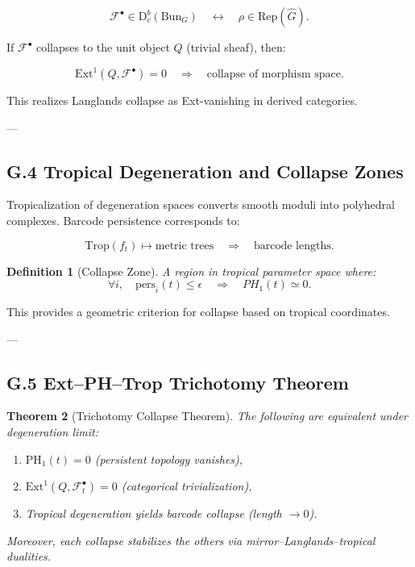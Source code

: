 \documentclass[11pt]{article}
\newtheorem{theorem}{Theorem}[section]
\newtheorem{definition}[theorem]{Definition}
\begin{document}
\[
\mathcal{F}^\bullet \in \mathrm{D}^b_c(\mathrm{Bun}_G) 
\quad \leftrightarrow \quad 
\rho \in \mathrm{Rep}(\widehat{G}).
\]

If $\mathcal{F}^\bullet$ collapses to the unit object $Q$ (trivial sheaf), then:

\[
\mathrm{Ext}^1(Q, \mathcal{F}^\bullet) = 0 
\quad \Rightarrow \quad 
\text{collapse of morphism space}.
\]

This realizes Langlands collapse as Ext-vanishing in derived categories.

---

\subsection*{G.4 Tropical Degeneration and Collapse Zones}

Tropicalization of degeneration spaces converts smooth moduli into polyhedral complexes.  
Barcode persistence corresponds to:

\[
\text{Trop}(f_t) \longmapsto \text{metric trees}
\quad \Rightarrow \quad 
\text{barcode lengths}.
\]

\begin{definition}[Collapse Zone]
A region in tropical parameter space where:
\[
\forall i, \quad \text{pers}_i(t) \leq \epsilon 
\quad \Rightarrow \quad 
PH_1(t) \simeq 0.
\]
\end{definition}

This provides a geometric criterion for collapse based on tropical coordinates.

---

\subsection*{G.5 Ext–PH–Trop Trichotomy Theorem}

\begin{theorem}[Trichotomy Collapse Theorem]
The following are equivalent under degeneration limit:
\begin{enumerate}
  \item $\mathrm{PH}_1(t) = 0$ (persistent topology vanishes),
  \item $\mathrm{Ext}^1(Q, \mathcal{F}^\bullet_t) = 0$ (categorical trivialization),
  \item Tropical degeneration yields barcode collapse (length $\to 0$).
\end{enumerate}
Moreover, each collapse stabilizes the others via mirror–Langlands–tropical dualities.
\end{theorem}
\end{document}

